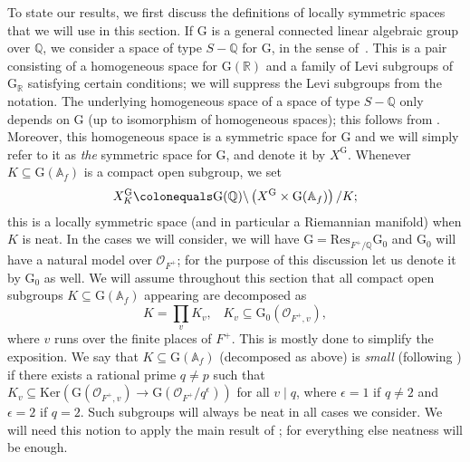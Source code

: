 \documentclass{amsart}
\theoremstyle{remark}
\numberwithin{equation}{subsection}
\newcommand{\A}{\AA}
\newcommand{\Q}{\QQ}
\newcommand{\R}{\RR}
\renewcommand{\AA}{{\mathbb A}}
\newcommand{\QQ}{{\mathbb Q}}
\newcommand{\RR}{{\mathbb R}}
\newcommand{\cO}{{\mathcal O}}
\newcommand{\sub}{\subseteq}
\newcommand{\defeq}{\colonequals}
\renewcommand{\(}{\left(}
\renewcommand{\)}{\right)}
\begin{document}
To state our results, we first discuss the definitions of locally symmetric spaces that we will use in this section. If $\mathrm{G}$ is a general connected linear algebraic group over $\Q$, 
we consider a space of type $S-\Q$ for $\mathrm{G}$,
in the sense of~\cite[\S 2]{borel-serre}. This is a pair consisting of a homogeneous
space for $\mathrm{G}(\R)$ and a family of Levi subgroups
of $\mathrm{G}_{\R}$ satisfying certain conditions; we will suppress the Levi subgroups from the notation. The underlying homogeneous space of a space of type $S-\Q$ only depends on $\mathrm{G}$ (up to isomorphism of homogeneous spaces); this follows from \cite[Lem. 2.1]{borel-serre}. Moreover, this homogeneous space is a symmetric space for $\mathrm{G}$ and we will simply refer to it as \emph{the} symmetric space for $\mathrm{G}$, and denote it by $X^{\mathrm{G}}$.  
Whenever $K \sub \mathrm{G}(\A_f)$ is a compact open subgroup, we set 
\[
X^\mathrm{G}_{K}\defeq \mathrm{G}(\Q)\backslash \left(X^\mathrm{G}\times \mathrm{G}(\A_f)\right)/K;
\] 
this is a locally symmetric space (and in particular a Riemannian manifold) when $K$ is neat. In the cases we will consider, we will have $\mathrm{G}=\mathrm{Res}_{F^+/\Q}\mathrm{G}_0$ and $\mathrm{G}_0$ will have a natural model over $\cO_{F^+}$; for the purpose of this discussion let us denote it by $\mathrm{G}_0$ as well. We will assume throughout this section that all compact open subgroups $K\sub \mathrm{G}(\A_f)$ appearing are decomposed as
\[
K = \prod_v K_v, \,\,\,\,\, K_v \sub \mathrm{G}_0(\cO_{F^+,v}),
\]
where $v$ runs over the finite places of $F^+$. This is mostly done to simplify the exposition. We say that $K \sub \mathrm{G}(\A_f)$ (decomposed as above) is \emph{small} (following \cite[Definition 5.6]{newton-thorne}) if there exists a rational prime $q\neq p$ such that $K_v \sub \mathrm{Ker}(\mathrm{G}(\cO_{F^+,v}) \to \mathrm{G}(\cO_{F^+}/q^\epsilon))$ for all $v\mid q$, where $\epsilon=1$ if $q\neq 2$ and $\epsilon =2 $ if $q=2$. Such subgroups will always be neat in all cases we consider. We will need this notion to apply the main result of \cite{scholze-galois}; for everything else neatness will be enough.

\medskip
\end{document}
